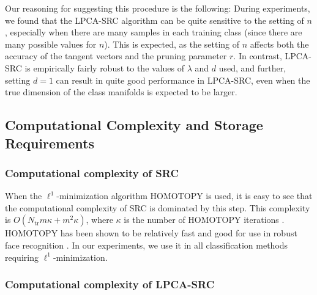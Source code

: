 \documentclass[review]{elsarticle}
\begin{document}
Our reasoning for suggesting this procedure is the following: During experiments, we found that the LPCA-SRC algorithm can be quite sensitive to the setting of $n$, especially when there are many samples in each training class (since there are many possible values for $n$). This is expected, as the setting of $n$ affects both the accuracy of the tangent vectors and the pruning parameter $r$. In contrast, LPCA-SRC is empirically fairly robust to the values of $\lambda$ and $d$ used, and further, setting $d=1$ can result in quite good performance in LPCA-SRC, even when the true dimension of the class manifolds is expected to be larger. 





\subsection{Computational Complexity and Storage Requirements}\label{sec:cc}



\subsubsection{Computational complexity of SRC}

When the $\ell^1$-minimization algorithm HOMOTOPY \cite{don:hom} is used, it is easy to see that the computational complexity of SRC is dominated by this step. This complexity is $O(N_\mathrm{tr}m\kappa+ m^2\kappa)$, where $\kappa$ is the number of HOMOTOPY iterations \cite{yan:rev}. HOMOTOPY has been shown to be relatively fast and good for use in robust face recognition \cite{yan:rev}. In our experiments, we use it in all classification methods requiring $\ell^1$-minimization. 



\subsubsection{Computational complexity of LPCA-SRC}
\end{document}
